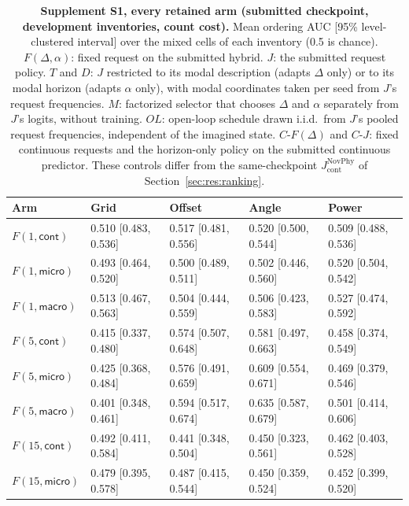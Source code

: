 \begin{table}[t]
\centering
\footnotesize
\setlength{\tabcolsep}{4pt}
\begin{revblock}
\caption{\textbf{Supplement S1, every retained arm (submitted checkpoint, development inventories, count cost).} Mean ordering AUC [95\% level-clustered interval] over the mixed cells of each inventory (0.5 is chance). $F(\Delta,\alpha)$: fixed request on the submitted hybrid. $J$: the submitted request policy. $T$ and $D$: $J$ restricted to its modal description (adapts $\Delta$ only) or to its modal horizon (adapts $\alpha$ only), with modal coordinates taken per seed from $J$'s request frequencies. $M$: factorized selector that chooses $\Delta$ and $\alpha$ separately from $J$'s logits, without training. $OL$: open-loop schedule drawn i.i.d.\ from $J$'s pooled request frequencies, independent of the imagined state. $C\text{-}F(\Delta)$ and $C\text{-}J$: fixed continuous requests and the horizon-only policy on the submitted continuous predictor. These controls differ from the same-checkpoint $J_{\mathrm{cont}}^{\mathrm{NovPhy}}$ of Section~\ref{sec:res:ranking}.}
\label{tab:app:dev:s1arms}
\begin{tabular}{@{}lllll@{}}
\toprule
Arm & Grid & Offset & Angle & Power \\
\midrule
$F(1,\textsf{cont})$   & 0.510 [0.483, 0.536] & 0.517 [0.481, 0.556] & 0.520 [0.500, 0.544] & 0.509 [0.488, 0.536] \\
$F(1,\textsf{micro})$  & 0.493 [0.464, 0.520] & 0.500 [0.489, 0.511] & 0.502 [0.446, 0.560] & 0.520 [0.504, 0.542] \\
$F(1,\textsf{macro})$  & 0.513 [0.467, 0.563] & 0.504 [0.444, 0.559] & 0.506 [0.423, 0.583] & 0.527 [0.474, 0.592] \\
$F(5,\textsf{cont})$   & 0.415 [0.337, 0.480] & 0.574 [0.507, 0.648] & 0.581 [0.497, 0.663] & 0.458 [0.374, 0.549] \\
$F(5,\textsf{micro})$  & 0.425 [0.368, 0.484] & 0.576 [0.491, 0.659] & 0.609 [0.554, 0.671] & 0.469 [0.379, 0.546] \\
$F(5,\textsf{macro})$  & 0.401 [0.348, 0.461] & 0.594 [0.517, 0.674] & 0.635 [0.587, 0.679] & 0.501 [0.414, 0.606] \\
$F(15,\textsf{cont})$  & 0.492 [0.411, 0.584] & 0.441 [0.348, 0.504] & 0.450 [0.323, 0.561] & 0.462 [0.403, 0.528] \\
$F(15,\textsf{micro})$ & 0.479 [0.395, 0.578] & 0.487 [0.415, 0.544] & 0.450 [0.359, 0.524] & 0.452 [0.399, 0.520] \\

\end{tabular}
\end{revblock}
\end{table}
